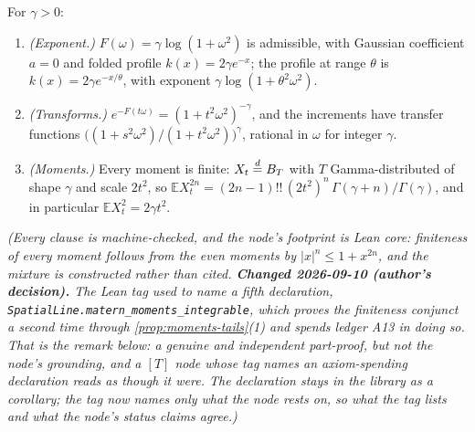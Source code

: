 \begin{proposition}\label{prop:matern-exponent}
\leanok
{}
For $\gamma > 0$:
\begin{enumerate}
\item \emph{(Exponent.)} $F(\omega) = \gamma\log(1 + \omega^2)$ is admissible, with Gaussian
coefficient $a = 0$ and folded profile $k(x) = 2\gamma e^{-x}$; the profile at range $\theta$ is
$k(x) = 2\gamma e^{-x/\theta}$, with exponent $\gamma\log(1 + \theta^2\omega^2)$.
\item \emph{(Transforms.)} $e^{-F(t\omega)} = (1 + t^2\omega^2)^{-\gamma}$, and the increments
have transfer functions $\bigl((1 + s^2\omega^2)/(1 + t^2\omega^2)\bigr)^{\gamma}$, rational in
$\omega$ for integer $\gamma$.
\item \emph{(Moments.)} Every moment is finite: $X_t \stackrel{d}{=} B_T$ with $T$ Gamma-distributed of
shape $\gamma$ and scale $2t^2$, so
$\mathbb{E}X_t^{2n} = (2n-1)!!\,(2t^2)^n\,\Gamma(\gamma+n)/\Gamma(\gamma)$, and in particular
$\mathbb{E}X_t^2 = 2\gamma t^2$.
\end{enumerate}
\statusT\quad\emph{(Every clause is machine-checked, and the node's footprint is Lean core:
finiteness of every moment follows from the even moments by $|x|^n \le 1 + x^{2n}$, and the
mixture is constructed rather than cited. \textbf{Changed 2026-09-10 (author's decision).} The
Lean tag used to name a fifth declaration, \texttt{SpatialLine.matern\_moments\_integrable},
which proves the finiteness conjunct a second time through \ref{prop:moments-tails}(1) and
spends ledger A13 in doing so. That is the remark below: a genuine and independent part-proof,
but not the node's grounding, and a $[T]$ node whose tag names an axiom-spending declaration
reads as though it were. The declaration stays in the library as a corollary; the tag now names
only what the node rests on, so what the tag lists and what the node's status claims agree.)}
\end{proposition}

